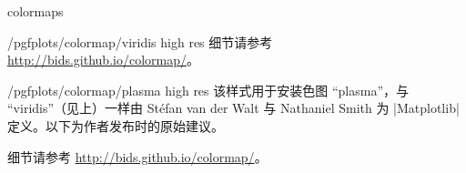 \begin{pgfplotslibrary}{colormaps}
\begin{stylekey}{/pgfplots/colormap/viridis high res}
    细节请参考 \url{http://bids.github.io/colormap/}。
\begin{codeexample}
\pgfplotsset{
    colormap name=viridis,
}
\end{codeexample}

\begin{codeexample}
\pgfplotsset{
    colormap/viridis high res,
}
\end{codeexample}
\end{stylekey}

\begin{stylekey}{/pgfplots/colormap/plasma high res}
    该样式用于安装色图 ``plasma''，与 ``viridis''（见上）一样由 Stéfan van der Walt
    与 Nathaniel Smith 为 |Matplotlib| 定义。以下为作者发布时的原始建议。

    细节请参考 \url{http://bids.github.io/colormap/}。
\begin{codeexample}
\pgfplotsset{
    colormap name=plasma,
}
\end{codeexample}

\begin{codeexample}
\pgfplotsset{
    colormap/plasma high res,
}
\end{codeexample}
\end{stylekey}

\end{pgfplotslibrary}
\endgroup
